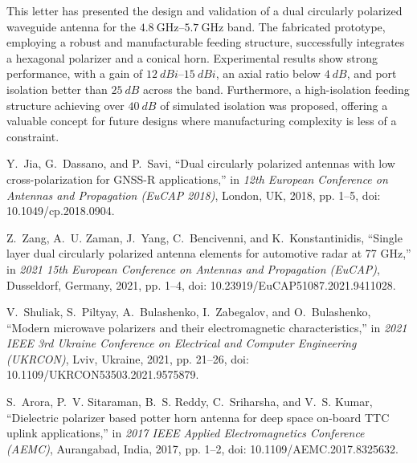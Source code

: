 \documentclass[journal]{IEEEtran}
\newcommand{\frequencyrange}{\qtyrange{4.8}{5.7}{\giga\hertz}}
\begin{document}
This letter has presented the design and validation of a dual circularly polarized waveguide antenna for the $\frequencyrange$ band. The fabricated prototype, employing a robust and manufacturable feeding structure, successfully integrates a hexagonal polarizer and a conical horn. Experimental results show strong performance, with a gain of $\qtyrange{12}{15}{dBi}$, an axial ratio below $\qty{4}{dB}$, and port isolation better than $\qty{25}{dB}$ across the band. Furthermore, a high-isolation feeding structure achieving over $\qty{40}{dB}$ of simulated isolation was proposed, offering a valuable concept for future designs where manufacturing complexity is less of a constraint.


\begin{thebibliography}{24}
    
    Y.~Jia, G.~Dassano, and P.~Savi, ``Dual circularly polarized antennas with low cross-polarization for GNSS-R applications,'' in \emph{12th European Conference on Antennas and Propagation (EuCAP 2018)}, London, UK, 2018, pp. 1--5, doi: 10.1049/cp.2018.0904.

    Z.~Zang, A.~U. Zaman, J.~Yang, C.~Bencivenni, and K.~Konstantinidis, ``Single layer dual circularly polarized antenna elements for automotive radar at 77 GHz,'' in \emph{2021 15th European Conference on Antennas and Propagation (EuCAP)}, Dusseldorf, Germany, 2021, pp. 1--4, doi: 10.23919/EuCAP51087.2021.9411028.
    
    V.~Shuliak, S.~Piltyay, A.~Bulashenko, I.~Zabegalov, and O.~Bulashenko, ``Modern microwave polarizers and their electromagnetic characteristics,'' in \emph{2021 IEEE 3rd Ukraine Conference on Electrical and Computer Engineering (UKRCON)}, Lviv, Ukraine, 2021, pp. 21--26, doi: 10.1109/UKRCON53503.2021.9575879.

    S.~Arora, P.~V. Sitaraman, B.~S. Reddy, C.~Sriharsha, and V.~S. Kumar, ``Dielectric polarizer based potter horn antenna for deep space on-board TTC uplink applications,'' in \emph{2017 IEEE Applied Electromagnetics Conference (AEMC)}, Aurangabad, India, 2017, pp. 1--2, doi: 10.1109/AEMC.2017.8325632.


\end{thebibliography}
\end{document}
